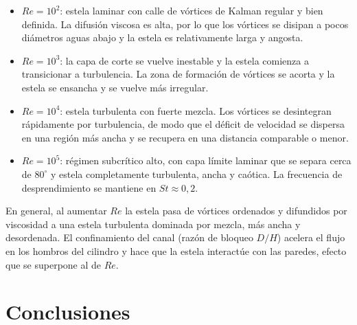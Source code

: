 \begin{itemize}
  \item $Re = 10^{2}$: estela laminar con calle de vórtices de Kalman
  regular y bien definida. La difusión viscosa es alta, por lo que los
  vórtices se disipan a pocos diámetros aguas abajo y la estela es
  relativamente larga y angosta.

  \item $Re = 10^{3}$: la capa de corte se vuelve inestable y la estela
  comienza a transicionar a turbulencia. La zona de formación de vórtices se
  acorta y la estela se ensancha y se vuelve más irregular.

  \item $Re = 10^{4}$: estela turbulenta con fuerte mezcla. Los vórtices se
  desintegran rápidamente por turbulencia, de modo que el déficit de velocidad
  se dispersa en una región más ancha y se recupera en una distancia
  comparable o menor.

  \item $Re = 10^{5}$: régimen subcrítico alto, con capa límite laminar que
  se separa cerca de $80^{\circ}$ y estela completamente turbulenta, ancha y
  caótica. La frecuencia de desprendimiento se mantiene en
  $St \approx 0{,}2$.
\end{itemize}

En general, al aumentar $Re$ la estela pasa de vórtices ordenados y
difundidos por viscosidad a una estela turbulenta dominada por mezcla, más
ancha y desordenada. El confinamiento del canal (razón de bloqueo $D/H$)
acelera el flujo en los hombros del cilindro y hace que la estela interactúe
con las paredes, efecto que se superpone al de $Re$.

\section{Conclusiones}


